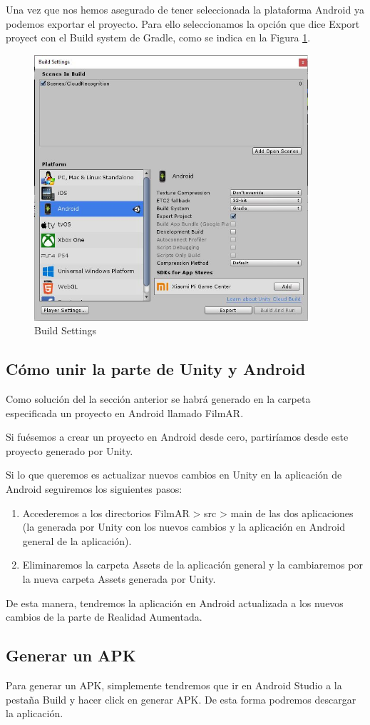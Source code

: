 \begin{enumerate}
    Una vez que nos hemos asegurado de tener seleccionada la plataforma Android ya podemos exportar el proyecto. Para ello seleccionamos la opción 
    que dice Export proyect con el Build system de Gradle, como se indica en la Figura \ref{fig:BuildSettings}.
    \begin{figure}[H]
        \centering
        \includegraphics[width=4in]{figures/Appendix-A/CapturaBuildSettings.JPG}
        \caption{Build Settings}
        \label{fig:BuildSettings}
    \end{figure}
\end{enumerate}
\subsection{Cómo unir la parte de Unity y Android}
Como solución del la sección anterior se habrá generado en la carpeta especificada un proyecto en Android llamado FilmAR.

Si fuésemos a crear un proyecto en Android desde cero, partiríamos desde este proyecto generado por Unity. 

Si lo que queremos es actualizar nuevos cambios en Unity en la aplicación de Android seguiremos los siguientes pasos:
\begin{enumerate}
    \item Accederemos a los directorios FilmAR > src > main de las dos aplicaciones (la generada por Unity con los nuevos cambios 
    y la aplicación en Android general de la aplicación).
    \item Eliminaremos la carpeta Assets de la aplicación general y la cambiaremos por la nueva carpeta Assets generada por Unity.
\end{enumerate}
De esta manera, tendremos la aplicación en Android actualizada a los nuevos cambios de la parte de Realidad Aumentada.
\subsection{Generar un APK}
Para generar un APK, simplemente tendremos que ir en Android Studio a la pestaña Build y hacer click en generar APK. De esta forma podremos 
descargar la aplicación.
